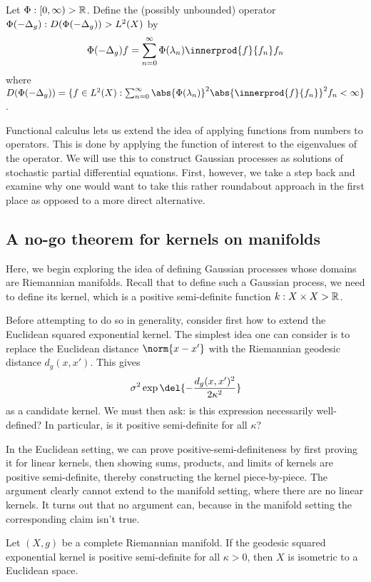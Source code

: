 \documentclass[11pt]{book}
\begin{document}
\begin{definition}
Let $\Phi : [0,\infty) \-> \mathbb{R}$. 
Define the (possibly unbounded) operator $\Phi(-\Delta_g) : D(\Phi(-\Delta_g)) \-> L^2(X)$ by
\[
\Phi(-\lap_g) f = \sum_{n=0}^\infty \Phi(\lambda_n) \innerprod{f}{f_n} f_n
\]
where $D(\Phi(-\lap_g)) = \{f \in L^2(X) : \sum_{n=0}^\infty \abs{\Phi(\lambda_n)}^2 \abs{\innerprod{f}{f_n}}^2 f_n < \infty\}$.
\end{definition}

Functional calculus lets us extend the idea of applying functions from numbers to operators.
This is done by applying the function of interest to the eigenvalues of the operator.
We will use this to construct Gaussian processes as solutions of stochastic partial differential equations.
First, however, we take a step back and examine why one would want to take this rather roundabout approach in the first place as opposed to a more direct alternative.

\subsection{A no-go theorem for kernels on manifolds}

Here, we begin exploring the idea of defining Gaussian processes whose domains are Riemannian manifolds.
Recall that to define such a Gaussian process, we need to define its kernel, which is a positive semi-definite function $k : X \times X \-> \mathbb{R}$.

Before attempting to do so in generality, consider first how to extend the Euclidean squared exponential kernel.
The simplest idea one can consider is to replace the Euclidean distance $\norm{x-x'}$ with the Riemannian geodesic distance $d_g(x,x')$.
This gives 
\[
\sigma^2 \exp\del{-\frac{d_g(x,x')^2}{2\kappa^2}}
\]
as a candidate kernel.
We must then ask: is this expression necessarily well-defined? 
In particular, is it positive semi-definite for all $\kappa$?

In the Euclidean setting, we can prove positive-semi-definiteness by first proving it for linear kernels, then showing sums, products, and limits of kernels are positive semi-definite, thereby constructing the kernel piece-by-piece.
The argument clearly cannot extend to the manifold setting, where there are no linear kernels.
It turns out that no argument can, because in the manifold setting the corresponding claim isn't true.

\begin{result}
Let $(X,g)$ be a complete Riemannian manifold.
If the geodesic squared exponential kernel is positive semi-definite for all $\kappa > 0$, then $X$ is isometric to a Euclidean space.
\end{result}
\end{document}

